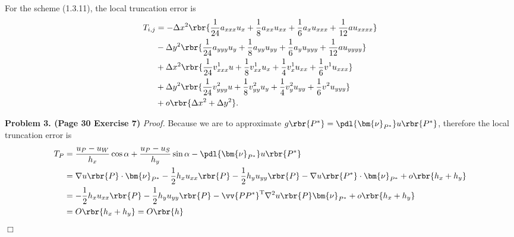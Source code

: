 \documentclass[english, nochinese]{pnote}
\begin{document}
For the scheme (1.3.11), the local truncation error is
\begin{equation}
\begin{split}
T_{ i, j } &= - \Delta x^2 \rbr{ \frac{1}{24} a_{ x x x } u_x + \frac{1}{8} a_{ x x } u_{ x x } + \frac{1}{6} a_x u_{ x x x } + \frac{1}{12} a u_{ x x x x } } \\
&- \Delta y^2 \rbr{ \frac{1}{24} a_{ y y y } u_y + \frac{1}{8} a_{ y y } u_{ y y } + \frac{1}{6} a_y u_{ y y y } + \frac{1}{12} a u_{ y y y y } } \\
&+ \Delta x^2 \rbr{ \frac{1}{24} v^1_{ x x x } u + \frac{1}{8} v^1_{ x x } u_x + \frac{1}{4} v^1_x u_{ x x } + \frac{1}{6} v^1 u_{ x x x } } \\
&+ \Delta y^2 \rbr{ \frac{1}{24} v^2_{ y y y } u + \frac{1}{8} v^2_{ y y } u_y + \frac{1}{4} v^2_y u_{ y y } + \frac{1}{6} v^2 u_{ y y y } } \\
&+ o \rbr{ \Delta x^2 + \Delta y^2 }.
\end{split}
\end{equation}

\textbf{Problem 3. (Page 30 Exercise 7)} \textit{Proof.} Because we are to approximate $ g \rbr{P^{\ast}} = \pdl{\bm{\nu}_{P^{\ast}}} u \rbr{P^{\ast}} $, therefore the local truncation error is
\begin{equation}
\begin{split}
T_P &= \frac{ u_P - u_W }{h_x} \cos \alpha + \frac{ u_P - u_S }{h_y} \sin \alpha - \pdl{\bm{\nu}_{P^{\ast}}} u \rbr{P^{\ast}} \\
&= \nabla u \rbr{P} \cdot \bm{\nu}_{P^{\ast}} - \frac{1}{2} h_x u_{ x x } \rbr{P} - \frac{1}{2} h_y u_{ y y } \rbr{P} - \nabla u \rbr{P^{\ast}} \cdot \bm{\nu}_{P^{\ast}} + o \rbr{ h_x + h_y } \\
&= -\frac{1}{2} h_x u_{ x x } \rbr{P} - \frac{1}{2} h_y u_{ y y } \rbr{P} - \vv{ P P^{\ast} }^{\text{T}} \nabla^2 u \rbr{P} \bm{\nu}_{P^{\ast}} + o \rbr{ h_x + h_y } \\
&= O \rbr{ h_x + h_y } = O \rbr{h}
\end{split}
\end{equation}
\hfill$\Box$
\end{document}
